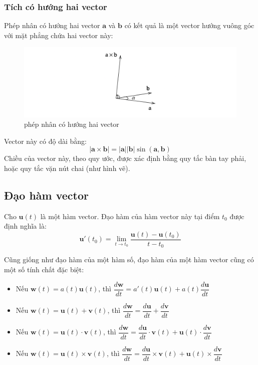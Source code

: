 \subsubsection{Tích có hướng hai vector}
Phép nhân có hướng hai vector \(\mathbf{a}\) và \(\mathbf{b}\) có kết quả là một vector hướng vuông góc với mặt phẳng chứa hai vector này:
\begin{figure}[H]
    \centering
    \includegraphics[width=1\textwidth]{Tuan2/Figures/tichcheo.png}
    \caption{phép nhân có hướng hai vector}
\end{figure}
Vector này có độ dài bằng:
\begin{equation}
    |\mathbf{a} \times \mathbf{b}| = |\mathbf{a}| |\mathbf{b}| \sin (\mathbf{a}, \mathbf{b})
\end{equation}
Chiều của vector này, theo quy ước,  được xác định bằng quy tắc bàn tay phải, hoặc quy tắc vặn nút chai (như hình vẽ).


\subsection{Đạo hàm vector}
\begin{definition}
    Cho \(\mathbf{u}(t)\) là một hàm vector. Đạo hàm của hàm vector này tại điểm \(t_0\) được định nghĩa là:
    \begin{equation}
        \mathbf{u}'(t_0) = \lim_{t \to t_0} \frac{\mathbf{u}(t) - \mathbf{u}(t_0)}{t - t_0}
    \end{equation}
\end{definition}
Cũng giống như đạo hàm của một hàm số, đạo hàm của một hàm vector cũng có một số tính chất đặc biệt:
\begin{itemize}
\item Nếu \(\mathbf{w}(t)=a(t)\mathbf{u}(t)\), thì \(\dfrac{d\mathbf{w}}{dt} = a'(t)\mathbf{u}(t) + a(t)\dfrac{d\mathbf{u}}{dt}\)
\item Nếu \(\mathbf{w}(t)=\mathbf{u}(t) + \mathbf{v}(t)\), thì \(\dfrac{d\mathbf{w}}{dt} = \dfrac{d\mathbf{u}}{dt} + \dfrac{d\mathbf{v}}{dt}\)
\item Nếu \(\mathbf{w}(t)=\mathbf{u}(t) \cdot \mathbf{v}(t)\), thì \(\dfrac{d\mathbf{w}}{dt} = \dfrac{d\mathbf{u}}{dt} \cdot \mathbf{v}(t) + \mathbf{u}(t) \cdot \dfrac{d\mathbf{v}}{dt}\)
\item Nếu \(\mathbf{w}(t)=\mathbf{u}(t) \times \mathbf{v}(t)\), thì \(\dfrac{d\mathbf{w}}{dt} = \dfrac{d\mathbf{u}}{dt} \times \mathbf{v}(t) + \mathbf{u}(t) \times \dfrac{d\mathbf{v}}{dt}\)
\end{itemize}

